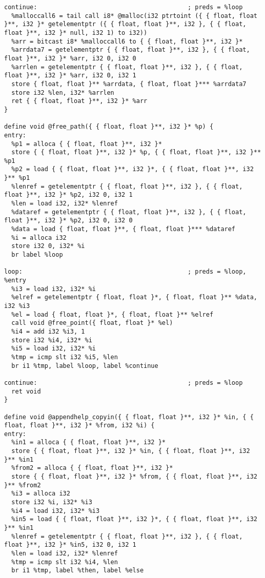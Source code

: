 \documentclass[main.tex]{subfiles}
\begin{document}
{\begin{lstlisting}
continue:                                         ; preds = %loop
  %malloccall6 = tail call i8* @malloc(i32 ptrtoint ({ { float, float }**, i32 }* getelementptr ({ { float, float }**, i32 }, { { float, float }**, i32 }* null, i32 1) to i32))
  %arr = bitcast i8* %malloccall6 to { { float, float }**, i32 }*
  %arrdata7 = getelementptr { { float, float }**, i32 }, { { float, float }**, i32 }* %arr, i32 0, i32 0
  %arrlen = getelementptr { { float, float }**, i32 }, { { float, float }**, i32 }* %arr, i32 0, i32 1
  store { float, float }** %arrdata, { float, float }*** %arrdata7
  store i32 %len, i32* %arrlen
  ret { { float, float }**, i32 }* %arr
}

define void @free_path({ { float, float }**, i32 }* %p) {
entry:
  %p1 = alloca { { float, float }**, i32 }*
  store { { float, float }**, i32 }* %p, { { float, float }**, i32 }** %p1
  %p2 = load { { float, float }**, i32 }*, { { float, float }**, i32 }** %p1
  %lenref = getelementptr { { float, float }**, i32 }, { { float, float }**, i32 }* %p2, i32 0, i32 1
  %len = load i32, i32* %lenref
  %dataref = getelementptr { { float, float }**, i32 }, { { float, float }**, i32 }* %p2, i32 0, i32 0
  %data = load { float, float }**, { float, float }*** %dataref
  %i = alloca i32
  store i32 0, i32* %i
  br label %loop

loop:                                             ; preds = %loop, %entry
  %i3 = load i32, i32* %i
  %elref = getelementptr { float, float }*, { float, float }** %data, i32 %i3
  %el = load { float, float }*, { float, float }** %elref
  call void @free_point({ float, float }* %el)
  %i4 = add i32 %i3, 1
  store i32 %i4, i32* %i
  %i5 = load i32, i32* %i
  %tmp = icmp slt i32 %i5, %len
  br i1 %tmp, label %loop, label %continue

continue:                                         ; preds = %loop
  ret void
}

define void @appendhelp_copyin({ { float, float }**, i32 }* %in, { { float, float }**, i32 }* %from, i32 %i) {
entry:
  %in1 = alloca { { float, float }**, i32 }*
  store { { float, float }**, i32 }* %in, { { float, float }**, i32 }** %in1
  %from2 = alloca { { float, float }**, i32 }*
  store { { float, float }**, i32 }* %from, { { float, float }**, i32 }** %from2
  %i3 = alloca i32
  store i32 %i, i32* %i3
  %i4 = load i32, i32* %i3
  %in5 = load { { float, float }**, i32 }*, { { float, float }**, i32 }** %in1
  %lenref = getelementptr { { float, float }**, i32 }, { { float, float }**, i32 }* %in5, i32 0, i32 1
  %len = load i32, i32* %lenref
  %tmp = icmp slt i32 %i4, %len
  br i1 %tmp, label %then, label %else


\end{lstlisting}}
\end{document}
